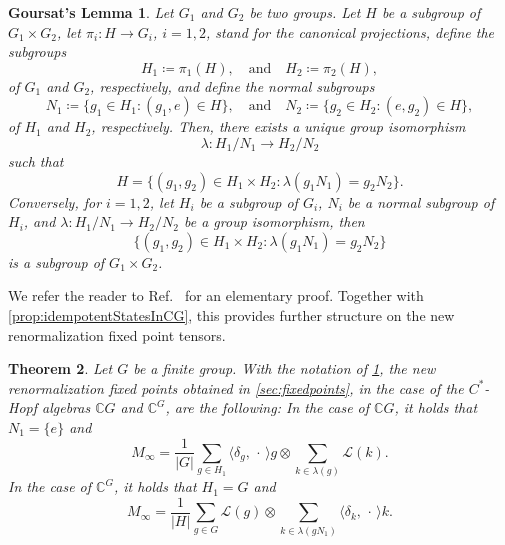 \documentclass[a4paper,10pt]{amsart}
\newcommand{\eval}[2]{\langle #1 , #2\rangle}
\newcommand{\placeholder}{\,\cdot\,}
\newtheorem{theorem}{Theorem}[section]
\newtheorem{goursat-lemma-num}[theorem]{Goursat's Lemma}
\theoremstyle{definition}
\begin{document}
\begin{goursat-lemma-num}
\label{lemma:Goursat}
Let $G_1$ and $G_2$ be two groups. Let $H$ be a subgroup of $G_1 \times G_2$, let $\pi_i:H\to G_i$, $i=1,2$, stand for the canonical projections, define the subgroups
\[
    H_1 \coloneqq \pi_1(H),
    \quad\text{and}\quad
    H_2 \coloneqq \pi_2(H), 
\]
of $G_1$ and $G_2$, respectively, and define the normal subgroups
\begin{equation}
    N_1 \coloneqq  \{ g_1 \in H_1 : (g_1,e) \in H \},
    \quad\text{and}\quad
    N_2 \coloneqq  \{ g_2 \in H_2 : (e,g_2) \in H \},
\end{equation}
of $H_1$ and $H_2$, respectively.
Then, there exists a unique group isomorphism
\[
    \lambda : H_1 / N_1 \to H_2 / N_2
\]
such that
\[
H = \{ (g_1,g_2) \in H_1 \times H_2 : 
       \lambda(g_1 N_1) = g_2 N_2 \}.
\]
Conversely,
for $i=1,2$,
let $H_i$ be a subgroup of $G_i$,
$N_i$ be a normal sub\-group of $H_i$,
and
$\lambda : H_1 / N_1 \to H_2 / N_2$ be a group isomorphism, then
\[
\{ (g_1,g_2) \in H_1 \times H_2 : \lambda(g_1 N_1) = g_2 N_2 \}
\]
is a subgroup of $G_1 \times G_2$.
\end{goursat-lemma-num}

We refer the reader to Ref.~\cite{dung_subgroups_2009} for an elementary proof. Together with \cref{prop:idempotentStatesInCG}, this provides further structure on the new renormalization fixed point tensors.
\begin{theorem}\label{thm:MinftyGroups}
    Let $G$ be a finite group. With the notation of \cref{lemma:Goursat}, the new renormalization fixed points obtained in \cref{sec:fixedpoints}, in the case of the $C^*$-Hopf algebras $\mathbb{C}G$ and $\mathbb{C}^G$, are the following:
    In the case of $\mathbb{C}G$, it holds that $N_1 = \{e\}$ and
	\begin{equation}\label{eq:MinftyCG}
        M_{\infty}
        =
       \frac{1}{|G|}\sum_{g\in H_1}
            \eval{\delta_g}{\placeholder} g \otimes
            \sum_{k\in \lambda(g)} \mathcal{L}(k).
	\end{equation}
    In the case of $\mathbb{C}^G$, it holds that $H_1 = G$ and
	\begin{equation}\label{eq:MinftyCGdual}
        M_{\infty}
        =
            \frac{1}{|H|}\sum_{g\in G}
                \mathcal{L}(g) \otimes 
                \sum_{k\in \lambda(gN_1)}
                    \eval{\delta_k}{\placeholder} k
                    .
	\end{equation}
\end{theorem}
\end{document}
